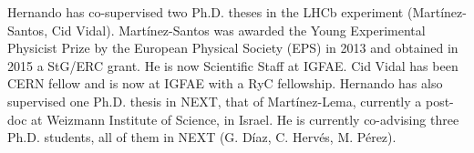 Hernando has co-supervised two Ph.D. theses in the LHCb experiment (Mart\'{i}nez-Santos,
Cid Vidal). Mart\'{i}nez-Santos was awarded the Young Experimental Physicist Prize by the European Physical Society (EPS) in 2013 and obtained in 2015 a StG/ERC grant. He is now Scientific Staff at IGFAE. Cid Vidal has been CERN fellow and is now at IGFAE with a RyC fellowship.
Hernando has also supervised one Ph.D. thesis in NEXT, that of Mart\'{i}nez-Lema, currently a post-doc at Weizmann Institute of Science, in Israel. He is 
currently co-advising three Ph.D. students, all of them in NEXT (G. D\'{i}az, C. Hervés, M. Pérez).

